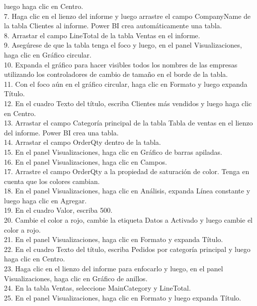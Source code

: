 \documentclass[12pt,letterpaper]{article}
\begin{document}
\begin{flushleft}
\begin{itemize}
luego haga clic en Centro.\\
7. Haga clic en el lienzo del informe y luego arrastre el campo CompanyName de la tabla Clientes al informe.
Power BI crea automáticamente una tabla.\\
8. Arrastar el campo LineTotal de la tabla Ventas en el informe.\\
9. Asegúrese de que la tabla tenga el foco y luego, en el panel Visualizaciones, haga clic en Gráfico circular.\\
10. Expanda el gráfico para hacer visibles todos los nombres de las empresas utilizando los controladores de cambio de tamaño en el borde
de la tabla.\\
11. Con el foco aún en el gráfico circular, haga clic en Formato y luego expanda Título.\\
12. En el cuadro Texto del título, escriba Clientes más vendidos y luego haga clic en Centro.\\
13. Arrastar el campo Categoría principal de la tabla Tabla de ventas en el lienzo del informe. Power BI crea una tabla.\\
14. Arrastar el campo OrderQty dentro de la tabla.\\
15. En el panel Visualizaciones, haga clic en Gráfico de barras apiladas.\\
16. En el panel Visualizaciones, haga clic en Campos.\\
17. Arrastre el campo OrderQty a la propiedad de saturación de color. Tenga en cuenta que los colores cambian.\\
18. En el panel Visualizaciones, haga clic en Análisis, expanda Línea constante y luego haga clic en Agregar.\\
19. En el cuadro Valor, escriba 500.\\
20. Cambie el color a rojo, cambie la etiqueta Datos a Activado y luego cambie el color a rojo.\\
21. En el panel Visualizaciones, haga clic en Formato y expanda Título.\\
22. En el cuadro Texto del título, escriba Pedidos por categoría principal y luego haga clic en Centro.\\
23. Haga clic en el lienzo del informe para enfocarlo y luego, en el panel Visualizaciones, haga clic en Gráfico de anillos.\\
24. En la tabla Ventas, seleccione MainCategory y LineTotal.\\
25. En el panel Visualizaciones, haga clic en Formato y luego expanda Título.\\

\end{itemize}
\end{flushleft}
\end{document}
